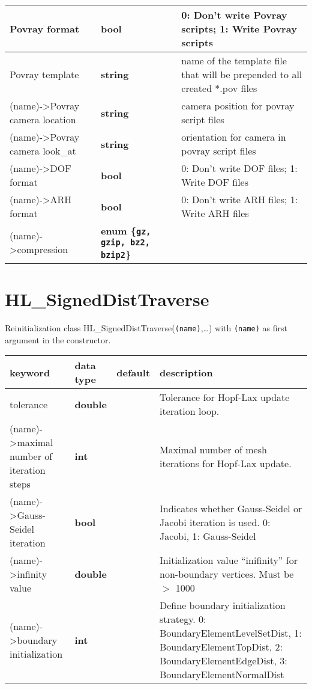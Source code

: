 \documentclass[10pt,a4paper]{article}
\newcommand{\basis}{{(name)->}}
\begin{document}
{\begin{longtable}[l]{|>{\ttfamily}lp{}>{\ttfamily}lp{}|}
\basis Povray format & \textbf{bool} & [0] & 0: Don't write Povray scripts; 1: Write Povray scripts\\ \hline
\basis Povray template & \textbf{string} & [] & name of the template file that will be prepended to all created *.pov files \\ \hline
\basis Povray camera location & \textbf{string} & [] & camera position for povray script files\\ \hline
\basis Povray camera look\_at & \textbf{string} & [] & orientation for camera in povray script files\\ \hline
\basis DOF format & \textbf{bool} & [0] & 0: Don't write DOF files; 1: Write DOF files\\ \hline
\basis ARH format & \textbf{bool} & [0] & 0: Don't write ARH files; 1: Write ARH files\\ \hline
\basis compression & \textbf{enum \{\texttt{gz, gzip, bz2, bzip2}\}} & [] & \\ \hline
\end{longtable}
}

\section*{HL\_SignedDistTraverse}
Reinitialization class HL\_SignedDistTraverse(\texttt{(name)},\ldots) with \texttt{(name)} as first argument in the constructor.
{
\small
\begin{longtable}[l]{|>{\ttfamily}lp{}>{\ttfamily}lp{}|}
\hline
\textrm{\textbf{keyword}} & \textrm{\textbf{data type}} & \textrm{\textbf{default}} & \textrm{\textbf{description}} \\
\hline\hline

\hline\basis tolerance & \textbf{double} & [] & Tolerance for Hopf-Lax update iteration loop.\\ \hline
\basis maximal number of iteration steps & \textbf{int} & [] & Maximal number of mesh iterations for Hopf-Lax update.\\ \hline
\basis Gauss-Seidel iteration & \textbf{bool} & [] & Indicates whether Gauss-Seidel or Jacobi iteration is used. 0: Jacobi, 1: Gauss-Seidel\\ \hline
\basis infinity value & \textbf{double} & [] & Initialization value ``inifinity'' for non-boundary vertices. Must be $>$ 1000\\ \hline
\basis boundary initialization & \textbf{int} & [] & Define boundary initialization strategy. 0: BoundaryElementLevelSetDist, 1: BoundaryElementTopDist, 2: BoundaryElementEdgeDist, 3: BoundaryElementNormalDist\\ \hline
\end{longtable}
}
\end{document}

